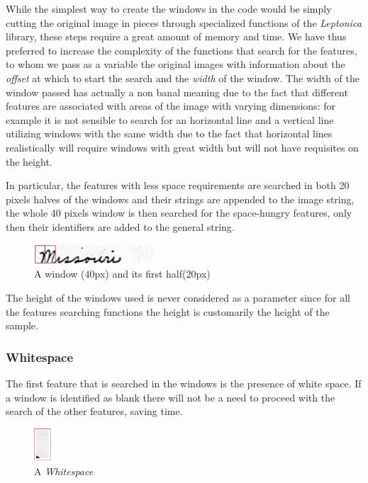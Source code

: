 While the simplest way to create the windows in the code would be simply cutting the original image in pieces through specialized functions of the \textit{Leptonica} library, these steps require a great amount of memory and time. We have thus preferred to increase the complexity of the functions that search for the features, to whom we pass as a variable the original images with information about the \textit{offset} at which to start the search and the \textit{width} of the window. The width of the window passed has actually a non banal meaning due to the fact that different features are associated with areas of the image with varying dimensions: for example it is not sensible to search for an horizontal line and a vertical line utilizing windows with the same width due to the fact that horizontal lines realistically will require windows with great width but will not have requisites on the height.


In particular, the features with less space requirements are searched in both 20 pixels halves of the windows and their strings are appended to the image string, the whole 40 pixels window is then searched for the space-hungry features, only then their identifiers are added to the general string. 

\begin{figure}[!htpb]
\centering
\includegraphics[width=0.4\textwidth]{images/missouri_windows.jpg}
\caption{A window (40px) and its first half(20px)}
\end{figure} 

The height of the windows used is never considered as a parameter since for all the features searching functions the height is customarily the height of the sample.  

\subsubsection{Whitespace}  

The first feature that is searched in the windows is the presence of white space. If a window is identified as blank there will not be a need to proceed with the search of the other features, saving time.

\begin{figure}[!htpb]
\centering
\includegraphics[width=0.06\textwidth]{images/whitespace.jpg}
\caption{A \textit{Whitespace}}
\end{figure} 

